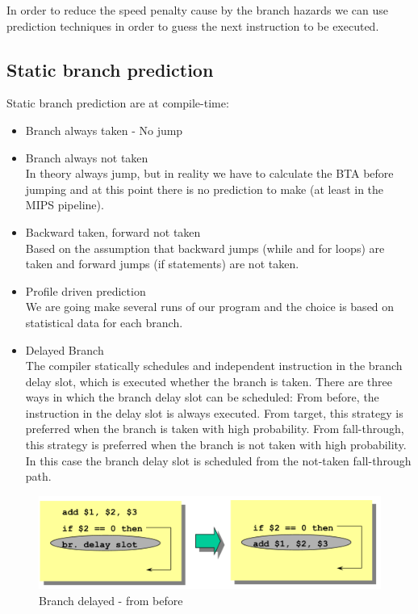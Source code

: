 In order to reduce the speed penalty cause by the branch hazards we can use prediction techniques in order to guess
the next instruction to be executed.

\subsection{Static branch prediction}\label{subsec:static-branch-prediction}
Static branch prediction are at compile-time:
\begin{itemize}
    \item Branch always taken - No jump
    \item Branch always not taken\\ In theory always jump, but in reality we have to calculate the BTA before jumping
    and at this point there is no prediction to make (at least in the MIPS pipeline).
    \item Backward taken, forward not taken\\
    Based on the assumption that backward jumps (while and for loops) are taken and forward jumps (if statements) are
    not taken.
    \item Profile driven prediction\\
    We are going make several runs of our program and the choice is based on statistical data for each branch.
    \item Delayed Branch\\
    The compiler statically schedules and independent instruction in the branch delay slot, which is executed whether
    the branch is taken.
    There are three ways in which the branch delay slot can be scheduled:
        \subitem From before, the instruction in the delay slot is always executed.
        \subitem From target, this strategy is preferred when the branch is taken with high probability.
        \subitem From fall-through, this strategy is preferred when the branch is not taken with high probability. In
    this case the branch delay slot is scheduled from the not-taken fall-through path.
\end{itemize}

\begin{figure}[h]
    \centering
    \includegraphics[scale = 0.4]{images/branch-delayed-from-before}
    \caption{Branch delayed - from before}
    \label{fig:branch-delayed-from-before}
\end{figure}

